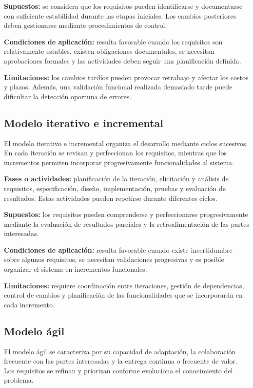 \documentclass[12pt,a4paper]{article}
\begin{document}
\textbf{Supuestos:} se considera que los requisitos pueden identificarse y documentarse con suficiente estabilidad durante las etapas iniciales. Los cambios posteriores deben gestionarse mediante procedimientos de control.

\textbf{Condiciones de aplicación:} resulta favorable cuando los requisitos son relativamente estables, existen obligaciones documentales, se necesitan aprobaciones formales y las actividades deben seguir una planificación definida.

\textbf{Limitaciones:} los cambios tardíos pueden provocar retrabajo y afectar los costos y plazos. Además, una validación funcional realizada demasiado tarde puede dificultar la detección oportuna de errores.

\subsection{Modelo iterativo e incremental}

El modelo iterativo e incremental organiza el desarrollo mediante ciclos sucesivos. En cada iteración se revisan y perfeccionan los requisitos, mientras que los incrementos permiten incorporar progresivamente funcionalidades al sistema.

\textbf{Fases o actividades:} planificación de la iteración, elicitación y análisis de requisitos, especificación, diseño, implementación, pruebas y evaluación de resultados. Estas actividades pueden repetirse durante diferentes ciclos.

\textbf{Supuestos:} los requisitos pueden comprenderse y perfeccionarse progresivamente mediante la evaluación de resultados parciales y la retroalimentación de las partes interesadas.

\textbf{Condiciones de aplicación:} resulta favorable cuando existe incertidumbre sobre algunos requisitos, se necesitan validaciones progresivas y es posible organizar el sistema en incrementos funcionales.

\textbf{Limitaciones:} requiere coordinación entre iteraciones, gestión de dependencias, control de cambios y planificación de las funcionalidades que se incorporarán en cada incremento.

\subsection{Modelo ágil}

El modelo ágil se caracteriza por su capacidad de adaptación, la colaboración frecuente con las partes interesadas y la entrega continua o frecuente de valor. Los requisitos se refinan y priorizan conforme evoluciona el conocimiento del problema.
\end{document}
